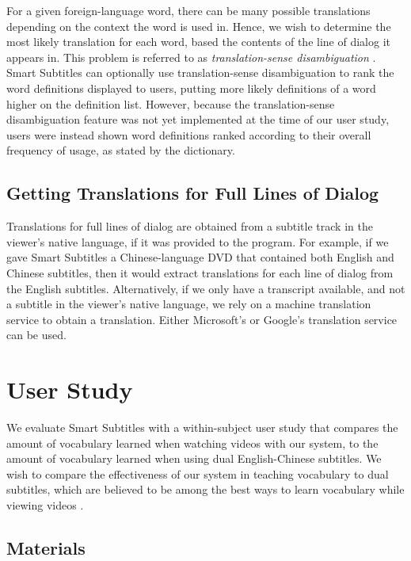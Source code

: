 \documentclass{sigchi}
\begin{document}
For a given foreign-language
word, there can be many possible translations depending on
the context the word is used in.
Hence, we wish to determine the most likely translation for each word,
based the contents of the line of dialog it appears in.
This problem is referred to as \emph{translation-sense disambiguation}
\cite{translationsense}.
Smart Subtitles can optionally use translation-sense disambiguation
to rank the word definitions displayed to users, putting
more likely definitions of a word higher on the definition list.
However, because the translation-sense disambiguation feature was not yet implemented at the time of our user study, users were instead shown word definitions ranked according to their overall frequency of usage,
as stated by the dictionary.

\subsection{Getting Translations for Full Lines of Dialog}

Translations for full lines of dialog are obtained from a subtitle track in the viewer's native language, if it was provided to 
the program. For example, if we gave Smart Subtitles a Chinese-language DVD
that contained both English and Chinese subtitles, then it would
extract translations for each line of dialog from the English subtitles.
Alternatively, if we only have a transcript available, and not a subtitle in the viewer's native language, we rely on a machine translation service to obtain a translation. Either Microsoft's or Google's translation service can be used.

\section{User Study}

We evaluate Smart Subtitles with a within-subject user study that compares the amount of vocabulary learned when watching videos with our system, to the amount of vocabulary learned when using dual English-Chinese subtitles. We wish to compare the effectiveness of our system in teaching vocabulary to dual subtitles, which are believed to be among the best ways to learn vocabulary while viewing videos \cite{raine2012incidental}.

\subsection{Materials}
\end{document}
